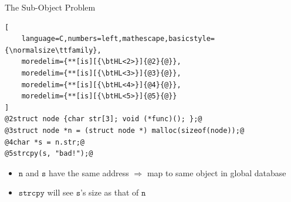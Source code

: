 \documentclass[aspectratio=169]{beamer}
\begin{document}
\begin{frame}[fragile]{The Sub-Object Problem}
\begin{lstlisting}[
    language=C,numbers=left,mathescape,basicstyle={\normalsize\ttfamily},
    moredelim={**[is][{\btHL<2>}]{@2}{@}},
    moredelim={**[is][{\btHL<3>}]{@3}{@}},
    moredelim={**[is][{\btHL<4>}]{@4}{@}},
    moredelim={**[is][{\btHL<5>}]{@5}{@}}
]
@2struct node {char str[3]; void (*func)(); };@
@3struct node *n = (struct node *) malloc(sizeof(node));@
@4char *s = n.str;@
@5strcpy(s, "bad!");@
\end{lstlisting}


    \begin{itemize}
        \item $\texttt{n}$ and $\texttt{s}$ have the same address $\Rightarrow$ map to same object in global database
        \item $\texttt{strcpy}$ will see $\texttt{s}$'s size as that of $\texttt{n}$
    \end{itemize}

\end{frame}



%
\end{document}
